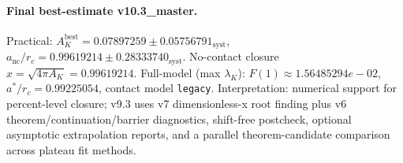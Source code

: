 \paragraph{Final best-estimate v10.3_master.}
Practical: $A_K^{\mathrm{best}} = 0.07897259 \pm 0.05756791_{\mathrm{syst}}$, $a_{\mathrm{nc}}/r_c = 0.99619214 \pm 0.28333740_{\mathrm{syst}}$.
No-contact closure $x = \sqrt{4\pi A_K} = 0.99619214$.
Full-model (max $\lambda_K$): $F(1) \approx 1.56485294e-02$, $a^*/r_c = 0.99225054$, contact model \texttt{legacy}.
Interpretation: numerical support for percent-level closure; v9.3 uses v7 dimensionless-x root finding plus v6 theorem/continuation/barrier diagnostics, shift-free postcheck, optional asymptotic extrapolation reports, and a parallel theorem-candidate comparison across plateau fit methods.
